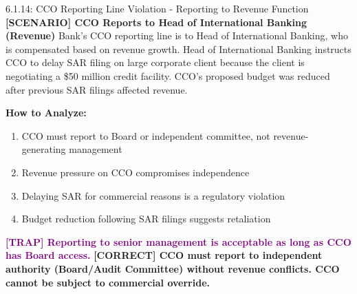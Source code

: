 \documentclass[11pt,a4paper]{beamer}
\newcommand{\trap}[1]{\textcolor{purple}{\textbf{[TRAP] #1}}}
\newcommand{\correct}[1]{\textcolor{green!50!black}{\textbf{[CORRECT] #1}}}
\newcommand{\scenario}[1]{\textcolor{blue!70!black}{\textbf{[SCENARIO] #1}}}
\begin{document}
\begin{frame}{6.1.14: CCO Reporting Line Violation - Reporting to Revenue Function}
	\scenario{CCO Reports to Head of International Banking (Revenue)}
	Bank's CCO reporting line is to Head of International Banking, who is compensated based on revenue growth. Head of International Banking instructs CCO to delay SAR filing on large corporate client because the client is negotiating a \$50 million credit facility. CCO's proposed budget was reduced after previous SAR filings affected revenue.
	
	\vspace{0.1cm}
	\textbf{How to Analyze:}
	\begin{enumerate}
		\item CCO must report to Board or independent committee, not revenue-generating management
		\item Revenue pressure on CCO compromises independence
		\item Delaying SAR for commercial reasons is a regulatory violation
		\item Budget reduction following SAR filings suggests retaliation
	\end{enumerate}
	\trap{Reporting to senior management is acceptable as long as CCO has Board access.}
	\correct{CCO must report to independent authority (Board/Audit Committee) without revenue conflicts. CCO cannot be subject to commercial override.}
\end{frame}
\end{document}
